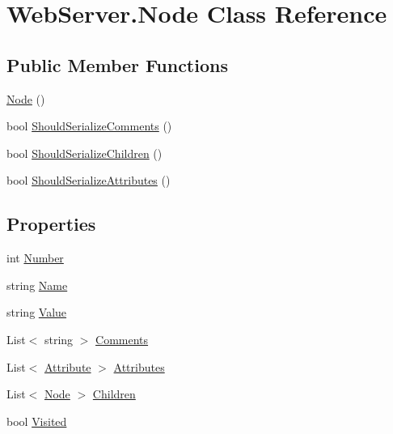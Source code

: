 \hypertarget{class_web_server_1_1_node}{}\section{Web\+Server.\+Node Class Reference}
\label{class_web_server_1_1_node}


 


\subsection*{Public Member Functions}
\begin{DoxyCompactItemize}
\item 
\hyperlink{class_web_server_1_1_node_a120c3b8357a7b3c5b4b5871816f63cdd}{Node} ()
\item 
bool \hyperlink{class_web_server_1_1_node_ae7a6e95e37f3e102453f2339131d04f0}{Should\+Serialize\+Comments} ()
\item 
bool \hyperlink{class_web_server_1_1_node_a0fc937fe8dc675fec4991d0acfc4af6a}{Should\+Serialize\+Children} ()
\item 
bool \hyperlink{class_web_server_1_1_node_a8cce64f897f2ef9571a6b0e74e45551f}{Should\+Serialize\+Attributes} ()
\end{DoxyCompactItemize}
\subsection*{Properties}
\begin{DoxyCompactItemize}
\item 
int \hyperlink{class_web_server_1_1_node_a5dcd1fef3300cfd6482a5a330f77ca8f}{Number}
\item 
string \hyperlink{class_web_server_1_1_node_af25fa6fe6325962eabc220cc43413a41}{Name}
\item 
string \hyperlink{class_web_server_1_1_node_a97c770bc5290d2d37bfea30a67d5f839}{Value}
\item 
List$<$ string $>$ \hyperlink{class_web_server_1_1_node_a6df5cac89012beddce9bc43b2dc82f8c}{Comments}
\item 
List$<$ \hyperlink{class_web_server_1_1_attribute}{Attribute} $>$ \hyperlink{class_web_server_1_1_node_a1eab0c9c9079b2b18c546dc293fa7dc5}{Attributes}
\item 
List$<$ \hyperlink{class_web_server_1_1_node}{Node} $>$ \hyperlink{class_web_server_1_1_node_a54936fd455c2d73feb51bff4525d1910}{Children}
\item 
bool \hyperlink{class_web_server_1_1_node_a09aaee2c59baa9487e330466ab4ff145}{Visited}
\end{DoxyCompactItemize}
